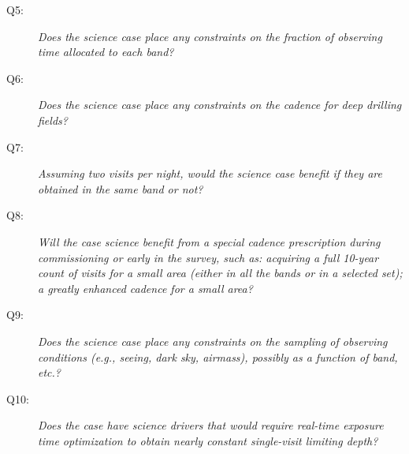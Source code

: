 \begin{description}

 \item[Q5:] {\it Does the science case place any constraints on the
 fraction of observing time allocated to each band?}


 \item[Q6:] {\it Does the science case place any constraints on the
 cadence for deep drilling fields?}


 \item[Q7:] {\it Assuming two visits per night, would the science case
 benefit if they are obtained in the same band or not?}


 \item[Q8:] {\it Will the case science benefit from a special cadence
 prescription during commissioning or early in the survey, such as:
 acquiring a full 10-year count of visits for a small area (either in all
 the bands or in a  selected set); a greatly enhanced cadence for a small
 area?}


 \item[Q9:] {\it Does the science case place any constraints on the
 sampling of observing conditions (e.g., seeing, dark sky, airmass),
 possibly as a function of band, etc.?}


 \item[Q10:] {\it Does the case have science drivers that would require
 real-time exposure time optimization to obtain nearly constant
 single-visit limiting depth?}


\end{description}


\navigationbar
